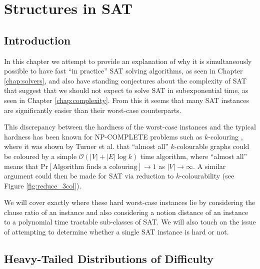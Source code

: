 \chapter{Structures in SAT} \label{chap:structure}

\ifpdf
    \graphicspath{{Chapter5/Figs/Raster/}{Chapter5/Figs/PDF/}{Chapter5/Figs/}}
\else
    \graphicspath{{Chapter5/Figs/Vector/}{Chapte5/Figs/}}
\fi

\section*{Introduction}
In this chapter we attempt to provide an explanation of why it is simultaneously
possible to have fast ``in practice'' SAT solving algorithms, as seen in Chapter
\ref{chap:solvers}, and also have standing conjectures about the complexity of
SAT that suggest that we should not expect to solve SAT in subexponential time,
as seen in Chapter \ref{chap:complexity}. From this it seems that many SAT instances
are significantly easier than their worst-case counterparts.

This discrepancy between the hardness of the worst-case instances and the typical
hardness has been known for NP-COMPLETE problems such as $k$-colouring \cite{turner1988almost}, where it was shown
by Turner et al. that ``almost all'' $k$-colourable
graphs could be coloured by a simple $\mathcal{O}(|V| + |E|\log k)$ time algorithm,
where ``almost all'' means that $\mathrm{Pr}[\text{Algorithm finds a colouring}] \to 1$
as $|V| \to \infty$. A similar argument could then be made for SAT via reduction to
$k$-colourability (see Figure \ref{fig:reduce_3col}).

We will cover exactly
where these hard worst-case instances lie by considering the clause ratio of an
instance and also considering a notion distance of an instance to a polynomial time tractable
sub-classes of SAT. We will also touch on the issue of attempting to determine whether
a single SAT instance is hard or not.

\section{Heavy-Tailed Distributions of Difficulty}
